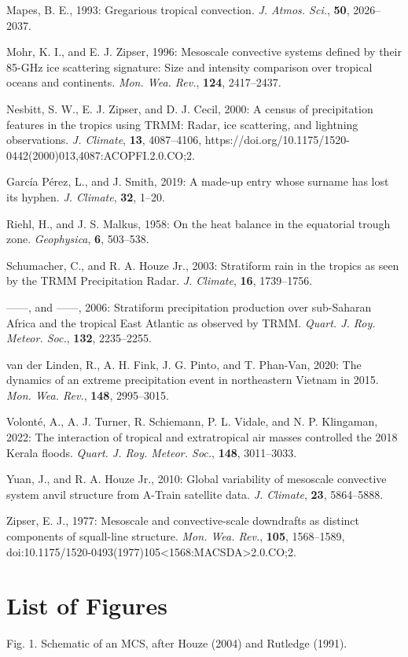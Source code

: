 \documentclass[12pt]{article}
\begin{document}
\begin{flushleft}
Mapes, B. E., 1993: Gregarious tropical convection. \textit{J. Atmos. Sci.}, \textbf{50}, 2026--2037.

Mohr, K. I., and E. J. Zipser, 1996: Mesoscale convective systems defined by their 85-GHz ice scattering signature: Size and intensity comparison over tropical oceans and continents. \textit{Mon. Wea. Rev.}, \textbf{124}, 2417--2437.

Nesbitt, S. W., E. J. Zipser, and D. J. Cecil, 2000: A census of precipitation features in the tropics using TRMM: Radar, ice scattering, and lightning observations. \textit{J. Climate}, \textbf{13}, 4087--4106, https://doi.org/10.1175/1520-0442(2000)013,4087:ACOPFI.2.0.CO;2.

García Pérez, L., and J. Smith, 2019: A made-up entry whose surname has lost its hyphen. \textit{J. Climate}, \textbf{32}, 1--20.

Riehl, H., and J. S. Malkus, 1958: On the heat balance in the equatorial trough zone. \textit{Geophysica}, \textbf{6}, 503--538.

Schumacher, C., and R. A. Houze Jr., 2003: Stratiform rain in the tropics as seen by the TRMM Precipitation Radar. \textit{J. Climate}, \textbf{16}, 1739--1756.

------, and ------, 2006: Stratiform precipitation production over sub-Saharan Africa and the tropical East Atlantic as observed by TRMM. \textit{Quart. J. Roy. Meteor. Soc.}, \textbf{132}, 2235--2255.

van der Linden, R., A. H. Fink, J. G. Pinto, and T. Phan-Van, 2020: The dynamics of an extreme precipitation event in northeastern Vietnam in 2015. \textit{Mon. Wea. Rev.}, \textbf{148}, 2995--3015.

Volonté, A., A. J. Turner, R. Schiemann, P. L. Vidale, and N. P. Klingaman, 2022: The interaction of tropical and extratropical air masses controlled the 2018 Kerala floods. \textit{Quart. J. Roy. Meteor. Soc.}, \textbf{148}, 3011--3033.

Yuan, J., and R. A. Houze Jr., 2010: Global variability of mesoscale convective system anvil structure from A-Train satellite data. \textit{J. Climate}, \textbf{23}, 5864--5888.

Zipser, E. J., 1977: Mesoscale and convective-scale downdrafts as distinct components of squall-line structure. \textit{Mon. Wea. Rev.}, \textbf{105}, 1568--1589, doi:10.1175/1520-0493(1977)105\textless1568:MACSDA\textgreater2.0.CO;2.

\end{flushleft}

\clearpage
\section*{List of Figures}
Fig. 1. Schematic of an MCS, after Houze (2004) and Rutledge (1991).
\end{document}
